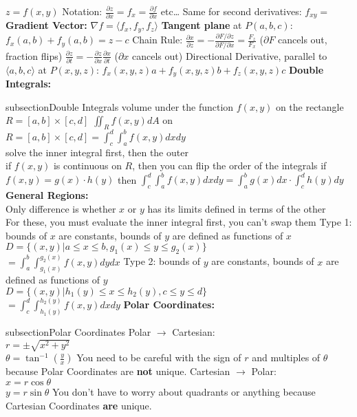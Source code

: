 \documentclass{article}
\newcommand{\upspace}{\vspace{0px}}
\newcommand{\zzz}[1]{\0 {\textbf{#1:}} \addcontentsline{toc} {subsection}{#1}}
\newcommand{\aaa}{\upspace \1}
\newcommand{\bbb}{\upspace \2}
\begin{document}
\begin{multicols*}{2}
\begin{outline}[compactitem]
	\aaa $z = f(x,y)$
	\aaa Notation: $\frac{\partial z}{\partial x} = f_x = \frac{\partial f}{\partial x} $ etc\ldots
		\bbb Same for second derivatives: $f_{xy} = \frac{}{}$
	\aaa \textbf{Gradient Vector:} $\nabla f = \langle f_x, f_y, f_z \rangle$
	\aaa \textbf{Tangent plane} at $P(a,b,c)$: $f_x(a,b) + f_y(a,b) = z - c$
	\aaa Chain Rule:
		\bbb $\frac{\partial x}{\partial z} = -\frac{\partial F / \partial z }{\partial F / \partial x} = \frac{F_z}{F_x}$ ($\partial F$ cancels out, fraction flips)
		\bbb $\frac{\partial z}{\partial t} = -\frac{\partial z}{\partial x} \frac{\partial x}{\partial t}$ ($\partial x$ cancels out)
	\aaa Directional Derivative, parallel to $\langle a,b,c \rangle$ at $P(x,y,z)$: $f_x(x,y,z)a + f_y(x,y,z)b + f_z(x,y,z)c$
\zzz{Double Integrals}
	\aaa volume under the function $f(x,y)$ on the rectangle $R = [a,b]\times[c,d]$
	\aaa $\iint_R f(x,y) dA$ on $R = [a,b]\times[c,d] = \int_c^d\int_a^bf(x,y)dxdy$
	\\ solve the inner integral first, then the outer
	\\ if $f(x,y)$ is continuous on $R$, then you can flip the order of the integrals
	\aaa if $f(x,y)=g(x)\cdot h(y)$ then $\int_c^d\int_a^bf(x,y)dxdy=\int_a^bg(x)dx\cdot\int_c^dh(y)dy$
	\aaa \textbf{General Regions:} 
	\\ Only difference is whether $x$ or $y$ has its limits defined in terms of the other
	\\ For these, you must evaluate the inner integral first, you can't swap them
		\bbb Type 1: bounds of $x$ are constants, bounds of $y$ are defined as functions of $x$
		\\ $D = \{(x,y)|a\leq x\leq b, g_1(x)\leq y\leq g_2(x)\}$
		\\ $=\int_a^b \int_{g_1(x)}^{g_2(x)} f(x,y) dy dx $
		\bbb Type 2: bounds of $y$ are constants, bounds of $x$ are defined as functions of $y$
		\\ $D = \{(x,y)|h_1(y)\leq x\leq h_2(y),c\leq y\leq d\}$
		\\ $=\int_c^d \int_{h_1(y)}^{h_2(y)} f(x,y) dx dy $
\zzz{Polar Coordinates}
	\aaa Polar $\rightarrow$ Cartesian:
	\\ $r = \pm\sqrt{x^2 + y^2}$
	\\ $\theta = \tan^{-1}(\frac{y}{x})$
		\bbb You need to be careful with the sign of $r$ and multiples of $\theta$ because Polar Coordinates are \textbf{not} unique.
	\aaa Cartesian $\rightarrow$ Polar:
	\\ $x = r\cos\theta$
	\\ $y = r\sin\theta$
		\bbb You don't have to worry about quadrants or anything because Cartesian Coordinates \textbf{are} unique.

\end{outline}
\end{multicols*}
\end{document}
